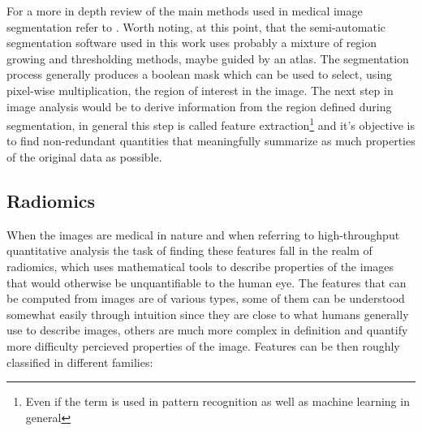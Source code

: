  For a more in depth review of the main methods used in medical image segmentation refer to \cite{Medical_img_segmentation}. Worth noting, at this point, that the semi-automatic segmentation software used in this work uses probably a mixture of region growing and thresholding methods, maybe guided by an atlas.
The segmentation process generally produces a boolean mask which can be used to select, using pixel-wise multiplication, the region of interest in the image. The next step in image analysis would be to derive information from the region defined during segmentation, in general this step is called feature extraction\footnote{Even if the term is used in pattern recognition as well as machine learning in general} and it's objective is to find non-redundant quantities that meaningfully summarize as much properties of the original data as possible.

\subsection{Radiomics}
 When the images are medical in nature and when referring to high-throughput quantitative analysis the task of finding these features fall in the realm of radiomics, which uses mathematical tools to describe properties of the images that would otherwise be unquantifiable to the human eye. The features that can be computed from images are of various types, some of them can be understood somewhat easily through intuition since they are close to what humans generally use to describe images, others are much more complex in definition and quantify more difficulty percieved properties of the image. Features can be then roughly classified in different families:


